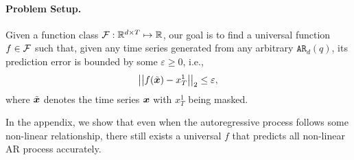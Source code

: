 \paragraph{Problem Setup.}
Given a function class $\mathcal{F}: \mathbb{R}^{d\times T}\mapsto \mathbb{R}$, our goal is to find a universal function $f\in\mathcal{F}$ such that, given any time series generated from any arbitrary $\mathtt{AR}_d(q)$, its prediction error is bounded by some $\varepsilon \geq 0$, i.e.,
\[
\left\lvert \left\lvert f( \Tilde{\bm{x}}) - x_{T}^1\right\rvert \right\rvert_2
\leq
\varepsilon,
\]
where $\Tilde{\bm{x}}$ denotes the time series $\bm{x}$ with $x_T^1$ being masked.
\begin{remark}
    In the appendix, we show that even when the autoregressive process follows some non-linear relationship, there still exists a universal $f$ that predicts all non-linear AR process accurately.
\end{remark}
